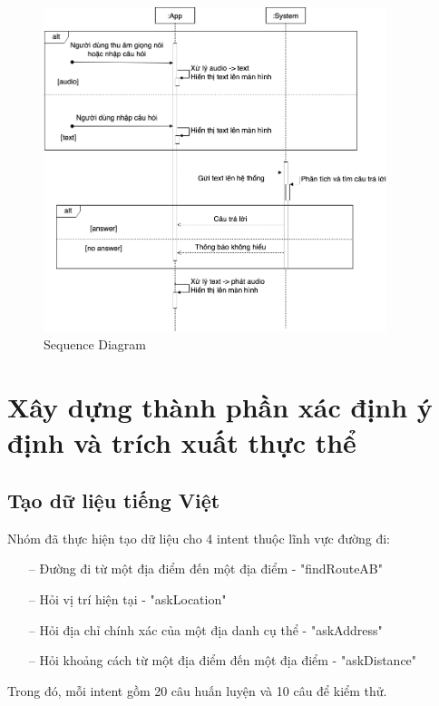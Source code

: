 \begin{figure}[H]
    \centering
    \includegraphics[width=10cm]{images/Sequence-Diagram.png}
    \caption{Sequence Diagram}
    \label{fig:Sequence-Diagram}
\end{figure}

\section{Xây dựng thành phần xác định ý định và trích xuất thực thể}
\subsection{Tạo dữ liệu tiếng Việt}
Nhóm đã thực hiện tạo dữ liệu cho 4 intent thuộc lĩnh vực đường đi:

\begin{itemize}
    \item[--] Đường đi từ một địa điểm đến một địa điểm - "findRouteAB"
    \item[--] Hỏi vị trí hiện tại - "askLocation"
    \item[--] Hỏi địa chỉ chính xác của một địa danh cụ thể - "askAddress"
    \item[--] Hỏi khoảng cách từ một địa điểm đến một địa điểm - "askDistance"
\end{itemize}

Trong đó, mỗi intent gồm 20 câu huấn luyện và 10 câu để kiểm thử.

